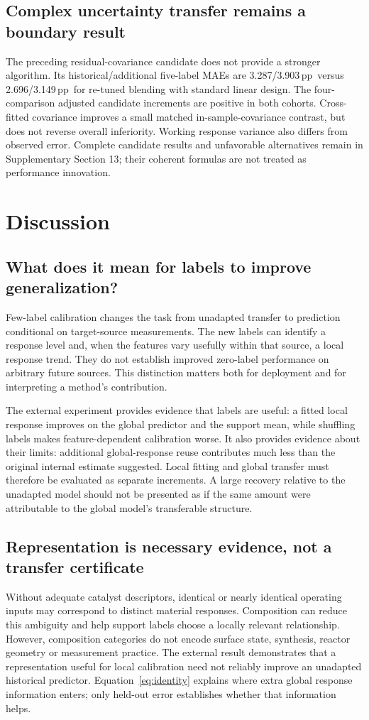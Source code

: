 \documentclass[11pt]{article}
\newcommand{\pp}{\,pp}
\begin{document}
\subsection{Complex uncertainty transfer remains a boundary result}
The preceding residual-covariance candidate does not provide a stronger algorithm. Its historical/additional five-label MAEs are 3.287/3.903\pp\ versus 2.696/3.149\pp\ for re-tuned blending with standard linear design. The four-comparison adjusted candidate increments are positive in both cohorts. Cross-fitted covariance improves a small matched in-sample-covariance contrast, but does not reverse overall inferiority. Working response variance also differs from observed error. Complete candidate results and unfavorable alternatives remain in Supplementary Section 13; their coherent formulas are not treated as performance innovation.

\section{Discussion}
\subsection{What does it mean for labels to improve generalization?}
Few-label calibration changes the task from unadapted transfer to prediction conditional on target-source measurements. The new labels can identify a response level and, when the features vary usefully within that source, a local response trend. They do not establish improved zero-label performance on arbitrary future sources. This distinction matters both for deployment and for interpreting a method's contribution.

The external experiment provides evidence that labels are useful: a fitted local response improves on the global predictor and the support mean, while shuffling labels makes feature-dependent calibration worse. It also provides evidence about their limits: additional global-response reuse contributes much less than the original internal estimate suggested. Local fitting and global transfer must therefore be evaluated as separate increments. A large recovery relative to the unadapted model should not be presented as if the same amount were attributable to the global model's transferable structure.

\subsection{Representation is necessary evidence, not a transfer certificate}
Without adequate catalyst descriptors, identical or nearly identical operating inputs may correspond to distinct material responses. Composition can reduce this ambiguity and help support labels choose a locally relevant relationship. However, composition categories do not encode surface state, synthesis, reactor geometry or measurement practice. The external result demonstrates that a representation useful for local calibration need not reliably improve an unadapted historical predictor. Equation~\ref{eq:identity} explains where extra global response information enters; only held-out error establishes whether that information helps.
\end{document}
